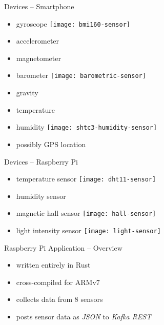 \documentclass[aspectratio=169]{beamer}
\begin{document}
  \begin{frame}{Devices -- Smartphone}
    \begin{itemize}
      \item gyroscope
            \hspace*{2em}
            \texttt{[image: bmi160-sensor]}
      \item accelerometer
      \item magnetometer
      \item barometer
            \hspace*{2em}
            \texttt{[image: barometric-sensor]}
      \item gravity
      \item temperature
      \item humidity
            \hspace*{2em}
            \texttt{[image: shtc3-humidity-sensor]}
      \item possibly GPS location
    \end{itemize}
  \end{frame}

  \begin{frame}{Devices -- Raspberry Pi}
    \begin{itemize}
      \item temperature sensor
            \hspace*{2em}
            \texttt{[image: dht11-sensor]}
      \item humidity sensor
      \item magnetic hall sensor
            \hspace*{2em}
            \texttt{[image: hall-sensor]}
      \item light intensity sensor
            \hspace*{2em}
            \texttt{[image: light-sensor]}
    \end{itemize}
  \end{frame}

  \begin{frame}{Raspberry Pi Application -- Overview}
    \begin{itemize}
      \item written entirely in Rust
      \item cross-compiled for ARMv7
      \item collects data from 8 sensors
      \item posts sensor data as \textit{JSON} to \textit{Kafka REST}
    \end{itemize}
  \end{frame}
\end{document}
